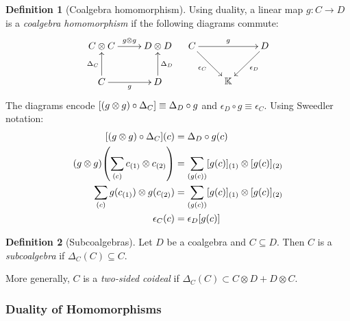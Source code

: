 \documentclass[svgnames]{article}
\theoremstyle{definition}
\newtheorem{Definition}{Definition}
\theoremstyle{remark}
\theoremstyle{underline}
\theoremstyle{underline}
\begin{document}
	\begin{Definition}[Coalgebra homomorphism]
		Using duality, a linear map $g\colon C \to D$ is a \emph{coalgebra homomorphism} if the following diagrams commute:
		\begin{align*}
			\xymatrix{
				C \otimes C \ar[r]^-{g \otimes g} & D \otimes D \\
				C \ar[u]^-{\Delta_C} \ar[r]_-{g} & D \ar[u]_-{\Delta_D}
			} & &
			\xymatrix{
				C \ar[rr]^-{g} \ar[rd]_-{\epsilon_C} & & D \ar[ld]^-{\epsilon_D} \\
				& \mathbb K & 
			}
		\end{align*}
		The diagrams encode $\bqty{(g \otimes g) \circ \Delta_C} \equiv \Delta_D \circ g$ and $\epsilon_D \circ g \equiv \epsilon_C$. Using Sweedler notation:
		\begin{align*}
			\bqty{(g \otimes g) \circ \Delta_C}(c) & = \Delta_D \circ g(c) \\
			\pqty{g \otimes g} \pqty{\sum_{(c)} c_{(1)} \otimes c_{(2)}} & = \sum_{\pqty{g(c)}} [g(c)]_{(1)} \otimes [g(c)]_{(2)} \\
			\sum_{(c)} g(c_{(1)}) \otimes g(c_{(2)}) & = \sum_{\pqty{g(c)}} [g(c)]_{(1)} \otimes [g(c)]_{(2)} \\
			\epsilon_C(c) & = \epsilon_D[g(c)]
		\end{align*}
	\end{Definition}

	\begin{Definition}[Subcoalgebras]
		Let $D$ be a coalgebra and $C \subseteq D$. Then $C$ is a \emph{subcoalgebra} if $\Delta_C(C) \subseteq C$.
	\end{Definition}
	More generally, $C$ is a \emph{two-sided coideal} if $\Delta_C(C) \subset C \otimes D + D \otimes C$.

	\subsubsection{Duality of Homomorphisms}
\end{document}
